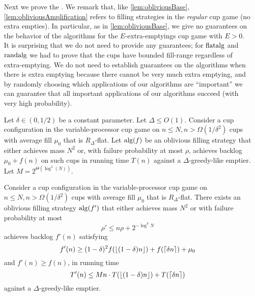Next we prove the . We remark
that, like \cref{lem:obliviousBase},
\cref{lem:obliviousAmplification} refers to filling strategies in
the \emph{regular} cup game (no extra empties). In particular, as
in \cref{lem:obliviousBase}, we give no guarantees on the
behavior of the algorithms for the $E$-extra-emptyings cup game
with $E > 0$. It is surprising that we do not need to provide
any guarantees; for $\operatorname{\text{\textup{flatalg}}}$ and $\operatorname{\text{\textup{randalg}}}$ we had to prove
that the cups have bounded fill-range regardless of
extra-emptying. We do not need to establish guarantees on the
algorithms when there is extra emptying because
there cannot be very much extra emptying, and by randomly
choosing which applications of our algorithms are
\enquote{important} we can guarantee that all important
applications of our algorithms succeed (with very high
probability).

\begin{lemma}
  \label{lem:obliviousAmplification} 
  Let $\delta \in (0, 1/2)$ be a constant parameter. Let $\Delta
  \le O(1)$. Consider a cup configuration
  in the variable-processor cup game on $n \le N, n >
  \Omega(1/\delta^2)$ cups with average fill $\mu_0$ that is
  $R_\Delta$-flat. Let $\operatorname{\text{\textup{alg}}}(f)$ be an oblivious filling strategy
  that either achieves mass $N^2$ or, with failure probability at
  most $\rho$, achieves backlog $\mu_0 + f(n)$ on such cups
  in running time $T(n)$ against a $\Delta$-greedy-like emptier.
  Let $M = 2^{\Theta(\log^5 (N))}$.

  Consider a cup configuration in the variable-processor cup game
  on $n \le N, n > \Omega(1/\delta^2)$ cups with average fill
  $\mu_0$ that is $R_\Delta$-flat. There exists an oblivious
  filling strategy $\operatorname{\text{\textup{alg}}}(f')$ that either achieves mass $N^2$ or
  with failure probability at most 
  $$\rho' \le n\rho + 2^{-\log^8 N}$$
  achieves backlog $f'(n)$ satisfying 
  $$f'(n) \ge (1-\delta)^2 f(\left\lfloor (1-\delta)n \right\rfloor) + f(\left\lceil \delta n \right\rceil) + \mu_0$$ 
  and $f'(n) \ge f(n)$, in running time 
  $$T'(n) \le Mn\cdot T(\left\lfloor (1-\delta)n \right\rfloor) + T(\left\lceil \delta n \right\rceil)$$
  against a $\Delta$-greedy-like emptier.
\end{lemma}

